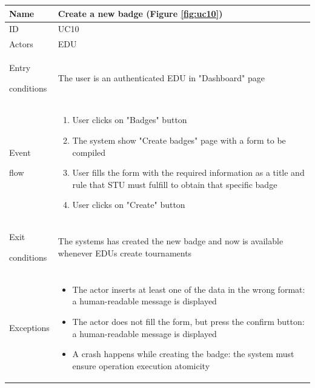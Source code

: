 \begin{center}
    \def\arraystretch{1.5}
    \begin{tabular}{| m{2cm} | m{10cm}|}
        \hline
        Name                  & Create a new badge  (Figure \ref{fig:uc10}) \\ \hline
        ID                    & UC10                                         \\ \hline
        Actors                & EDU                          \\ \hline
        Entry \par conditions & The user is an authenticated EDU in "Dashboard" page                                          \\ \hline
        Event \par flow       & \begin{enumerate}
                                    \item User clicks on "Badges" button
                                    \item The system show "Create badges" page with a form to be compiled
                                    \item User fills the form with the required information as a title and rule that STU must fulfill to obtain that specific badge
                                    \item User clicks on "Create" button
                                \end{enumerate}                            \\ \hline
        Exit \par conditions  & The systems has created the new badge and now is available whenever EDUs create tournaments\\ \hline
        Exceptions            & \begin{itemize}
                                    \item The actor inserts at least one of the data in the wrong format: a human-readable message is displayed
                                    \item The actor does not fill the form, but press the confirm button: a human-readable message is displayed
                                    \item {\color{red}A crash happens while creating the badge: the system must ensure operation execution atomicity}
                                \end{itemize}                              \\ \hline
    \end{tabular}
\end{center}

